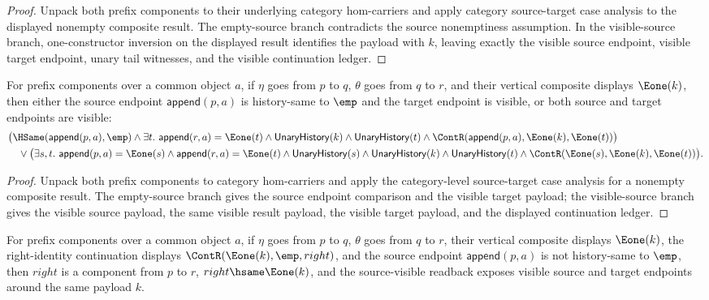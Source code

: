 \begin{proof}
Unpack both prefix components to their underlying category hom-carriers and
apply category source-target case analysis to the displayed nonempty composite
result. The empty-source branch contradicts the source nonemptiness
assumption. In the visible-source branch, one-constructor inversion on the
displayed result identifies the payload with $k$, leaving exactly the visible
source endpoint, visible target endpoint, unary tail witnesses, and the
visible continuation ledger.
\end{proof}
\begin{theorem}
\label{thm:nattrans-prefix-component-carrier-vert-comp-nonempty-result-source-target-cases}
For prefix components over a common object $a$, if $\eta$ goes from $p$ to
$q$, $\theta$ goes from $q$ to $r$, and their vertical composite displays
$\Eone(k)$, then either the source endpoint $\mathsf{append}(p,a)$ is
history-same to $\emp$ and the target endpoint is visible, or both source and
target endpoints are visible:
$$
\begin{aligned}
&\bigl(\HSame(\mathsf{append}(p,a),\emp)\land
\exists t.\ \mathsf{append}(r,a)=\Eone(t)\land
\mathsf{UnaryHistory}(k)\land\mathsf{UnaryHistory}(t)\land
\ContR(\mathsf{append}(p,a),\Eone(k),\Eone(t))\bigr)
\\
&\quad{}\lor
\bigl(\exists s,t.\ \mathsf{append}(p,a)=\Eone(s)\land
\mathsf{append}(r,a)=\Eone(t)\land
\mathsf{UnaryHistory}(s)\land\mathsf{UnaryHistory}(k)\land
\mathsf{UnaryHistory}(t)\land
\ContR(\Eone(s),\Eone(k),\Eone(t))\bigr).
\end{aligned}
$$
\end{theorem}
\begin{proof}
Unpack both prefix components to category hom-carriers and apply the
category-level source-target case analysis for a nonempty composite result.
The empty-source branch gives the source endpoint comparison and the visible
target payload; the visible-source branch gives the visible source payload,
the same visible result payload, the visible target payload, and the displayed
continuation ledger.
\end{proof}
\begin{theorem}
\label{thm:nattrans-prefix-component-carrier-vert-comp-nonempty-result-right-identity-visible-readback}
For prefix components over a common object $a$, if $\eta$ goes from $p$ to
$q$, $\theta$ goes from $q$ to $r$, their vertical composite displays
$\Eone(k)$, the right-identity continuation displays $\ContR(\Eone(k),\emp,right)$,
and the source endpoint $\mathsf{append}(p,a)$ is not history-same to $\emp$,
then $right$ is a component from $p$ to $r$, $right\hsame\Eone(k)$, and the
source-visible readback exposes visible source and target endpoints around
the same payload $k$.
\end{theorem}
